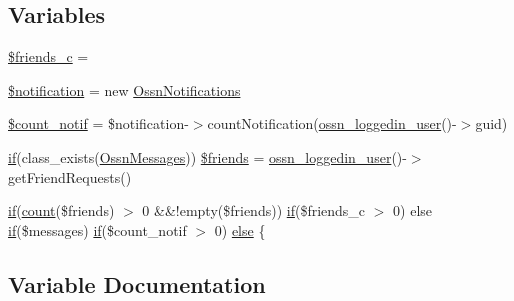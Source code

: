 \subsection*{Variables}
\begin{DoxyCompactItemize}
\item 
\hyperlink{components_2_ossn_notifications_2plugins_2default_2notifications_2page_2topbar_8php_a05bfc2642b96a903187d7e18360d0fc5}{\$friends\+\_\+c} = \textquotesingle{}\textquotesingle{}
\item 
\hyperlink{components_2_ossn_notifications_2plugins_2default_2notifications_2page_2topbar_8php_a31b24031fc7fcaa7848766b56934949b}{\$notification} = new \hyperlink{class_ossn_notifications}{Ossn\+Notifications}
\item 
\hyperlink{components_2_ossn_notifications_2plugins_2default_2notifications_2page_2topbar_8php_a776ddcc904c1f6fae69fc780588295fb}{\$count\+\_\+notif} = \$notification-\/$>$count\+Notification(\hyperlink{ossn_8lib_8users_8php_aa3c8068d0e6638b414d6a2f6c62565b8}{ossn\+\_\+loggedin\+\_\+user}()-\/$>$guid)
\item 
\hyperlink{jquery_8tokeninput_8js_ad8dd46a3cbc004569e34401e9e71771a}{if}(class\+\_\+exists(\textquotesingle{}\hyperlink{class_ossn_messages}{Ossn\+Messages}\textquotesingle{})) \hyperlink{components_2_ossn_notifications_2plugins_2default_2notifications_2page_2topbar_8php_a878aa1665e726bbc723f95ed06a1dec7}{\$friends} = \hyperlink{ossn_8lib_8users_8php_aa3c8068d0e6638b414d6a2f6c62565b8}{ossn\+\_\+loggedin\+\_\+user}()-\/$>$get\+Friend\+Requests()
\item 
\hyperlink{jquery_8tokeninput_8js_ad8dd46a3cbc004569e34401e9e71771a}{if}(\hyperlink{photos_2pages_2photos_8php_a364678aa3bd05301b3d1b8650653cf48}{count}(\$friends) $>$ 0 \&\&!empty(\$friends)) \hyperlink{jquery_8tokeninput_8js_ad8dd46a3cbc004569e34401e9e71771a}{if}(\$friends\+\_\+c $>$ 0) else \hyperlink{jquery_8tokeninput_8js_ad8dd46a3cbc004569e34401e9e71771a}{if}(\$messages) \hyperlink{jquery_8tokeninput_8js_ad8dd46a3cbc004569e34401e9e71771a}{if}(\$count\+\_\+notif $>$ 0) \hyperlink{components_2_ossn_notifications_2plugins_2default_2notifications_2page_2topbar_8php_a2995dfffcf30766221327de483a8ee5c}{else} \{
\end{DoxyCompactItemize}


\subsection{Variable Documentation}
